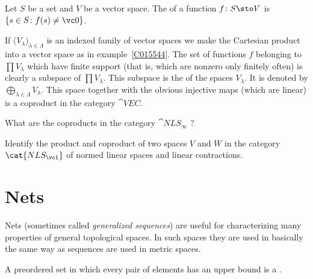 \begin{defn}  Let $S$ be a set and $V$ be a vector space. The
 of a function $f \colon S \sto V$ is $\{s \in S \colon f(s) \ne \vc 0\}$.
\end{defn}

\begin{exam}\label{X_dir_sum_VEC} If $\bigl(V_\lambda\bigr)_{\lambda \in \Lambda}$ is an indexed family of
vector spaces we make the Cartesian product into a vector space as in example~\ref{C015544}. The set of functions $f$
belonging to $\prod V_\lambda$ which have finite support (that is, which are nonzero only finitely often) is clearly
a subspace of $\prod V_\lambda$.  This subspace is the
 of the spaces $V_\lambda$.  It is denoted by $\bigoplus_{\lambda \in
\Lambda} V_\lambda$.  This space together with the obvious injective maps (which are
linear) is a
coproduct in the category $\cat{VEC}$.
\end{exam}

\begin{exer}  What are the coproducts in the category $\cat{NLS_{\boldsymbol\infty}}$ ?
\end{exer}

\begin{exer} Identify the product and coproduct of two spaces $V$ and $W$ in the category
$\cat{NLS_{\vc 1}}$ of normed linear spaces and linear contractions.
\end{exer}













\section{Nets}\label{C0314}
Nets (sometimes called \emph{generalized sequences}) are useful for characterizing many
properties of general topological spaces.  In such spaces they are used in basically
the same way as sequences are used in metric spaces.

\begin{defn} A preordered set in which every pair of elements has an upper bound is a
.
\end{defn}

